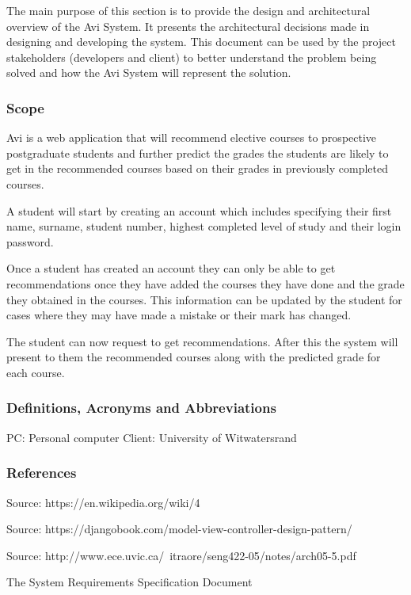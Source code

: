 \documentclass[10pt]{article}
\begin{document}
The main purpose of this section is to provide the design and architectural overview of the Avi System. It presents the architectural decisions made in designing and developing the system. This document can be used by the project stakeholders (developers and client) to better understand the problem being solved and how the Avi System will represent the solution.

\subsubsection{Scope}

Avi is a web application that will recommend elective courses to prospective postgraduate students and further predict the grades the students are likely to get in the recommended courses based on their grades in previously completed courses.

A student will start by creating an account which includes specifying their first name, surname, student number, highest completed level of study and their login password.

Once a student has created an account they can only be able to get recommendations once they have added the courses they have done and the grade they obtained in the courses. This information can be updated by the student for cases where they may have made a mistake or their mark has changed.

The student can now request to get recommendations. After this the system will present to them the recommended courses along with the predicted grade for each course.

\subsubsection{Definitions, Acronyms and Abbreviations}
PC:  Personal computer
Client: University of Witwatersrand

\subsubsection{References}

\begin{description}[font=$\bullet$~\normalfont\scshape\color{red!50!black}]
\item [] Source: https://en.wikipedia.org/wiki/4%
\item [] Source: https://djangobook.com/model-view-controller-design-pattern/
\item [] Source: http://www.ece.uvic.ca/~itraore/seng422-05/notes/arch05-5.pdf
\item [] The System Requirements Specification Document

\end{description}
\end{document}
